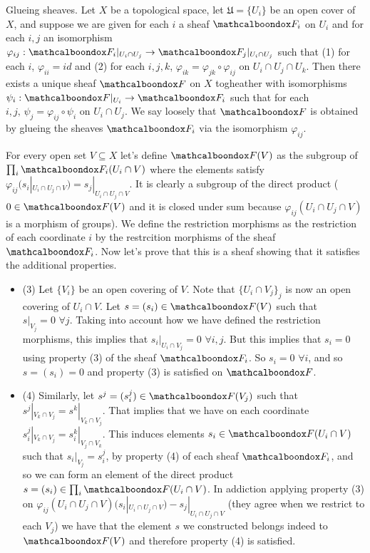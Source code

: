 \begin{ex}
	Glueing sheaves. Let $X$ be a topological space, let $\mathfrak{U} = \{U_i\}$ be an open cover of $X$, and suppose we are given for each $i$ a sheaf $\sF_i$ on $U_i$ and for each $i,j$ an isomorphism $\varphi_{ij}: \sF_i|_{U_i \cap U_j} \to \sF_j|_{U_i \cap U_j}$ such that (1) for each $i$, $\varphi_{ii} = id$ and (2) for each $i,j,k$, $\varphi_{ik} = \varphi_{jk} \circ \varphi_{ij}$ on $U_i \cap U_j \cap U_k$. Then there exists a unique sheaf $\sF$ on $X$ togheather with isomorphisms $\psi_i: \sF|_{U_i} \to \sF_i$ such that for each $i,j, \, \psi_j = \varphi_{ij} \circ \psi_i$ on $U_i \cap U_j$. We say loosely that $\sF$ is obtained by glueing the sheaves $\sF_i$ via the isomorphism $\varphi_{ij}$.
\end{ex}

\begin{sol}
	For every open set $V \subseteq X$ let's define $\sF(V)$ as the subgroup of $\prod_{i} \sF_i(U_i \cap V)$ where the elements satisfy $\varphi_{ij}(s_i|_{U_i \cap U_j \cap V}) = s_j|_{U_i \cap U_j \cap V}$. It is clearly a subgroup of the direct product ($0 \in \sF(V)$ and it is closed under sum because $\varphi_{ij}(U_i \cap U_j \cap V)$ is a morphism of groups). We define the restriction morphisms as the restriction of each coordinate $i$ by the restrcition morphisms of the sheaf $\sF_i$. Now let's prove that this is a sheaf showing that it satisfies the additional properties. 

	\begin{itemize}
		\item (3) Let $\{V_i\}$ be an open covering of $V$. Note that $\{U_i \cap V_j\}_j$ is now an open covering of $U_i \cap V$. Let $s = (s_i) \in \sF(V)$ such that $s|_{V_j} = 0 \, \, \forall j$. Taking into account how we have defined the restriction morphisms, this implies that $s_i|_{U_i \cap V_j} = 0 \, \, \forall i,j$. But this implies that $s_i = 0$ using property (3) of the sheaf $\sF_i$. So $s_i = 0 \, \, \forall i$, and so $s = (s_i) = 0$ and property (3) is satisfied on $\sF$. 

		\item (4) Similarly, let $s^j = (s_i^j) \in \sF(V_j)$ such that $s^j|_{V_k \cap V_j} = s^k|_{V_k \cap V_j}$. That implies that we have on each coordinate $s^j_i|_{V_k \cap V_j} = s^k_i|_{V_j \cap V_k}$. This induces elements $s_i \in \sF(U_i \cap V)$ such that $s_i|_{V_j} = s_i^j$, by property (4) of each sheaf $\sF_i$, and so we can form an element of the direct product $s = (s_i) \in \prod_{i} \sF(U_i \cap V)$. In addiction applying property (3) on $\varphi_{ij}(U_i \cap U_j \cap V)(s_i|_{U_i \cap U_j \cap V}) - s_j|_{U_i \cap U_j \cap V}$ (they agree when we restrict to each $V_j$) we have that the element $s$ we constructed belongs indeed to $\sF(V)$ and therefore property (4) is satisfied. 
	\end{itemize}


\end{sol}

